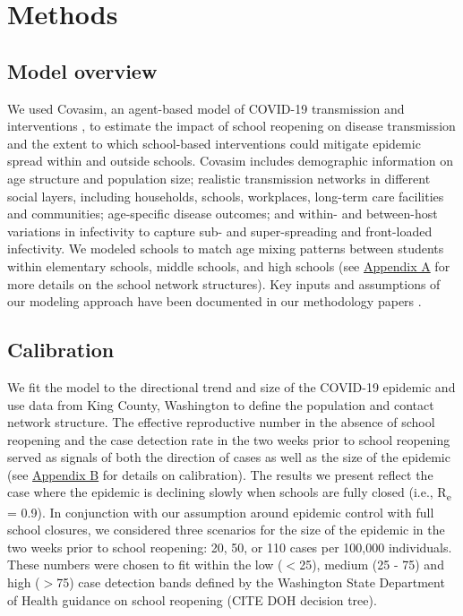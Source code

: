 \documentclass[preprint,12pt]{elsarticle}
\begin{document}
\section{Methods}
\subsection{Model overview}
We used Covasim, an agent-based model of COVID-19 transmission and interventions \cite{kerr_controlling_2020, kerr_covasim_2020}, to estimate the impact of school reopening on disease transmission and the extent to which school-based interventions could mitigate epidemic spread within and outside schools. Covasim includes demographic information on age structure and population size; realistic transmission networks in different social layers, including households, schools, workplaces, long-term care facilities and communities; age-specific disease outcomes; and within- and between-host variations in infectivity to capture sub- and super-spreading and front-loaded infectivity. We modeled schools to match age mixing patterns between students within elementary schools, middle schools, and high schools \cite{guclu_social_2016} (see \hyperref[sec:AppendixA]{Appendix A} for more details on the school network structures). Key inputs and assumptions of our modeling approach have been documented in our methodology papers \cite{kerr_controlling_2020, kerr_covasim_2020}.

\subsection{Calibration}

We fit the model to the directional trend and size of the COVID-19 epidemic and use data from King County, Washington to define the population and contact network structure. The effective reproductive number in the absence of school reopening and the case detection rate in the two weeks prior to school reopening served as signals of both the direction of cases as well as the size of the epidemic (see \hyperref[sec:AppendixB]{Appendix B} for details on calibration). The results we present reflect the case where the epidemic is declining slowly when schools are fully closed (i.e., R\textsubscript{e} = 0.9). In conjunction with our assumption around epidemic control with full school closures, we considered three scenarios for the size of the epidemic in the two weeks prior to school reopening: 20, 50, or 110 cases per 100,000 individuals. These numbers were chosen to fit within the low ($<$25), medium (25 - 75) and high ($>$75) case detection bands defined by the Washington State Department of Health guidance on school reopening (CITE DOH decision tree). %
\end{document}
